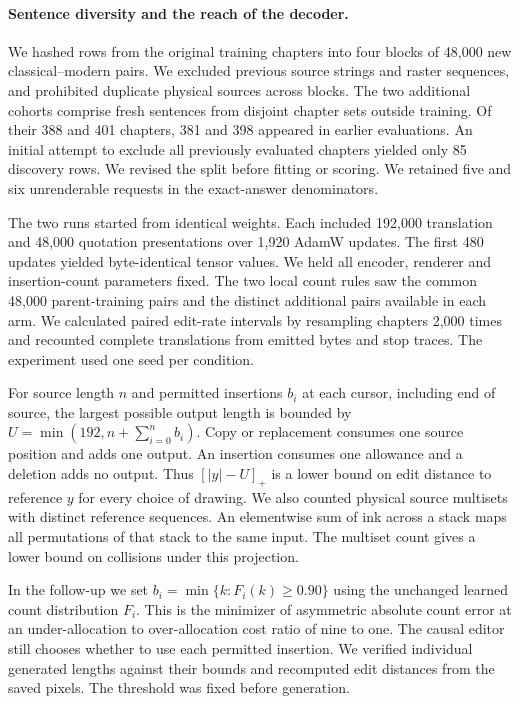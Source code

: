 \paragraph{Sentence diversity and the reach of the decoder.}
We hashed rows from the original training chapters into four blocks of 48,000 new classical--modern pairs. We excluded previous source strings and raster sequences, and prohibited duplicate physical sources across blocks. The two additional cohorts comprise fresh sentences from disjoint chapter sets outside training. Of their 388 and 401 chapters, 381 and 398 appeared in earlier evaluations. An initial attempt to exclude all previously evaluated chapters yielded only 85 discovery rows. We revised the split before fitting or scoring. We retained five and six unrenderable requests in the exact-answer denominators.

The two runs started from identical weights. Each included 192,000 translation and 48,000 quotation presentations over 1,920 AdamW updates. The first 480 updates yielded byte-identical tensor values. We held all encoder, renderer and insertion-count parameters fixed. The two local count rules saw the common 48,000 parent-training pairs and the distinct additional pairs available in each arm. We calculated paired edit-rate intervals by resampling chapters 2,000 times and recounted complete translations from emitted bytes and stop traces. The experiment used one seed per condition.

For source length $n$ and permitted insertions $b_i$ at each cursor, including end of source, the largest possible output length is bounded by $U=\min(192,n+\sum_{i=0}^{n} b_i)$. Copy or replacement consumes one source position and adds one output. An insertion consumes one allowance and a deletion adds no output. Thus $[|y|-U]_+$ is a lower bound on edit distance to reference $y$ for every choice of drawing. We also counted physical source multisets with distinct reference sequences. An elementwise sum of ink across a stack maps all permutations of that stack to the same input. The multiset count gives a lower bound on collisions under this projection.

In the follow-up we set $b_i=\min\{k:F_i(k)\geq0.90\}$ using the unchanged learned count distribution $F_i$. This is the minimizer of asymmetric absolute count error at an under-allocation to over-allocation cost ratio of nine to one. The causal editor still chooses whether to use each permitted insertion. We verified individual generated lengths against their bounds and recomputed edit distances from the saved pixels. The threshold was fixed before generation.
